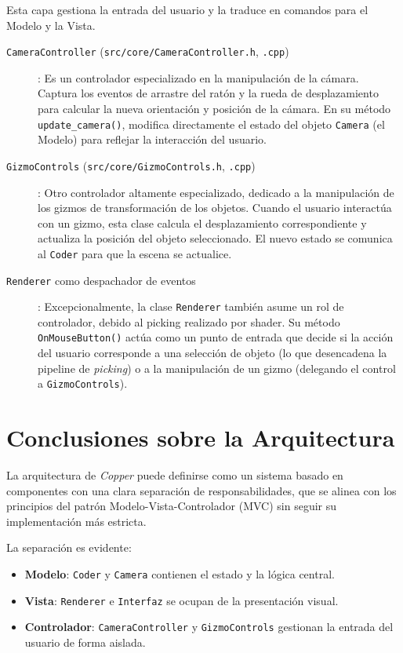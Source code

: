 Esta capa gestiona la entrada del usuario y la traduce en comandos para el
Modelo y la Vista.
\begin{description}
    \item[\texttt{CameraController} (\texttt{src/core/CameraController.h}, \texttt{.cpp})]: Es un controlador especializado en la manipulación de la cámara. Captura los eventos de arrastre del ratón y la rueda de desplazamiento para calcular la nueva orientación y posición de la cámara. En su método \texttt{update\_camera()}, modifica directamente el estado del objeto \texttt{Camera} (el Modelo) para reflejar la interacción del usuario.

    \item[\texttt{GizmoControls} (\texttt{src/core/GizmoControls.h}, \texttt{.cpp})]: Otro controlador altamente especializado, dedicado a la manipulación de los gizmos de transformación de los objetos. Cuando el usuario interactúa con un gizmo, esta clase calcula el desplazamiento correspondiente y actualiza la posición del objeto seleccionado. El nuevo estado se comunica al \texttt{Coder} para que la escena se actualice.

    \item[\texttt{Renderer} como despachador de eventos]: Excepcionalmente, la clase \texttt{Renderer} también asume un rol de controlador, debido al picking realizado por shader. Su método \texttt{OnMouseButton()} actúa como un punto de entrada que decide si la acción del usuario corresponde a una selección de objeto (lo que desencadena la pipeline de \textit{picking}) o a la manipulación de un gizmo (delegando el control a \texttt{GizmoControls}).
\end{description}

\section{Conclusiones sobre la Arquitectura}

La arquitectura de \textit{Copper} puede definirse como un sistema basado en
componentes con una clara separación de responsabilidades, que se alinea con
los principios del patrón Modelo-Vista-Controlador (MVC) sin seguir su
implementación más estricta.

La separación es evidente:
\begin{itemize}
    \item \textbf{Modelo}: \texttt{Coder} y \texttt{Camera} contienen el estado y la lógica central.
    \item \textbf{Vista}: \texttt{Renderer} e \texttt{Interfaz} se ocupan de la presentación visual.
    \item \textbf{Controlador}: \texttt{CameraController} y \texttt{GizmoControls} gestionan la entrada del usuario de forma aislada.
\end{itemize}

